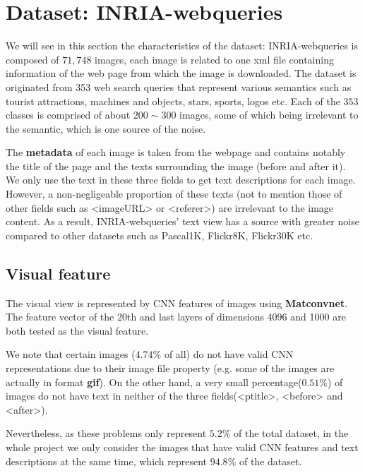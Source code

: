 \documentclass[12pt]{report}	%
\begin{document}
\section{Dataset: INRIA-webqueries}

We will see in this section the characteristics of the dataset: INRIA-webqueries is composed of $71,748$ images, each image is related to one xml file containing information of the web page from which the image is downloaded.
The dataset is originated from 353 web search queries that represent various semantics such as tourist attractions, machines and objects, stars, sports, logos etc. Each of the $353$ classes is comprised of about $200 \sim 300$ images, some of which being irrelevant to the semantic, which is one source of the noise.

The \textbf{metadata} of each image is taken from the webpage and contains notably the title of the page and the texts surrounding the image (before and after it). We only use the text in these three fields to get text descriptions for each image. However, a non-negligeable proportion of these texts (not to mention those of other fields such as <imageURL> or <referer>) are irrelevant to the image content. As a result, INRIA-webqueries' text view has a source with greater noise compared to other datasets such as Pascal1K, Flickr8K, Flickr30K etc. 


\subsection{Visual feature}
The visual view is represented by CNN features of images using \textbf{Matconvnet}. The feature vector of the 20th and last layers of dimensions 4096 and 1000 are both tested as the visual feature.

We note that certain images ($4.74\%$ of all) do not have valid CNN representations due to their image file property (e.g. some of the images are actually in format \textbf{gif}). On the other hand, a very small percentage($0.51\%$) of images do not have text in neither of the three fields(<ptitle>, <before> and <after>).

Nevertheless, as these problems only represent $5.2\%$ of the total dataset, in the whole project we only consider the images that have valid CNN features and text descriptions at the same time, which represent $94.8\%$ of the dataset.
\end{document}
